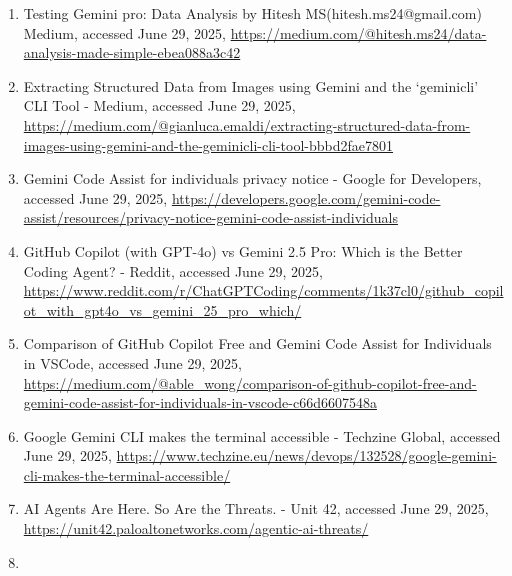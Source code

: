 \documentclass[a4paper,12pt]{article}
\begin{document}
\begin{multicols}{2}
\begin{enumerate}
    \item
      Testing Gemini pro: Data Analysis \textbar{} by Hitesh
      MS(hitesh.ms24@gmail.com) \textbar{} Medium, accessed June 29,
      2025,
      \href{https://medium.com/@hitesh.ms24/data-analysis-made-simple-ebea088a3c42}{https://medium.com/@hitesh.ms24/data-analysis-made-simple-ebea088a3c42}\\
    \item
      Extracting Structured Data from Images using Gemini and the
      `geminicli' CLI Tool - Medium, accessed June 29, 2025,
      \href{https://medium.com/@gianluca.emaldi/extracting-structured-data-from-images-using-gemini-and-the-geminicli-cli-tool-bbbd2fae7801}{https://medium.com/@gianluca.emaldi/extracting-structured-data-from-images-using-gemini-and-the-geminicli-cli-tool-bbbd2fae7801}\\
    \item
      Gemini Code Assist for individuals privacy notice - Google for
      Developers, accessed June 29, 2025,
      \url{https://developers.google.com/gemini-code-assist/resources/privacy-notice-gemini-code-assist-individuals}\\
    \item
      GitHub Copilot (with GPT-4o) vs Gemini 2.5 Pro: Which is the
      Better Coding Agent? - Reddit, accessed June 29, 2025,
      \url{https://www.reddit.com/r/ChatGPTCoding/comments/1k37cl0/github_copilot_with_gpt4o_vs_gemini_25_pro_which/}\\
    \item
      Comparison of GitHub Copilot Free and Gemini Code Assist for
      Individuals in VSCode, accessed June 29, 2025,
      \href{https://medium.com/@able_wong/comparison-of-github-copilot-free-and-gemini-code-assist-for-individuals-in-vscode-c66d6607548a}{https://medium.com/@able\_wong/comparison-of-github-copilot-free-and-gemini-code-assist-for-individuals-in-vscode-c66d6607548a}\\
    \item
      Google Gemini CLI makes the terminal accessible - Techzine Global,
      accessed June 29, 2025,
      \url{https://www.techzine.eu/news/devops/132528/google-gemini-cli-makes-the-terminal-accessible/}\\
    \item
      AI Agents Are Here. So Are the Threats. - Unit 42, accessed June
      29, 2025,
      \url{https://unit42.paloaltonetworks.com/agentic-ai-threats/}\\
    \item

\end{enumerate}
\end{multicols}
\end{document}
